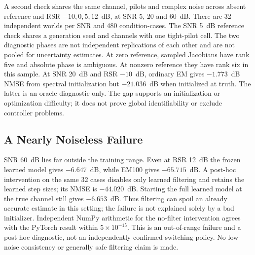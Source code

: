 A second check shares the same channel, pilots and complex noise across
absent reference and RSR $-10,0,5,12$~dB, at SNR 5, 20 and 60~dB.
There are 32 independent worlds per SNR and 480 condition-cases.
The SNR 5~dB reference check shares a generation seed and channels with
one tight-pilot cell. The two diagnostic phases are not independent
replications of each other and are not pooled for uncertainty estimates.
At zero reference, sampled Jacobians have rank five and absolute phase
is ambiguous. At nonzero reference they have rank six in this sample.
At SNR 20~dB and RSR $-10$~dB, ordinary EM gives $-1.773$~dB NMSE
from spectral initialization but $-21.036$~dB when initialized at truth.
The latter is an oracle diagnostic only. The gap supports an initialization
or optimization difficulty; it does not prove global identifiability or
exclude controller problems.

\subsection{A Nearly Noiseless Failure}
SNR 60~dB lies far outside the training range. Even at RSR 12~dB the
frozen learned model gives $-6.647$~dB, while EM100 gives $-65.715$~dB.
A post-hoc intervention on the same 32 cases disables only learned
filtering and retains the learned step sizes; its NMSE is $-44.020$~dB.
Starting the full learned model at the true channel still gives
$-6.653$~dB. Thus filtering can spoil an already accurate estimate in
this setting; the failure is not explained solely by a bad initializer.
Independent NumPy arithmetic for the no-filter intervention agrees with
the PyTorch result within $5\times10^{-15}$. This is an out-of-range
failure and a post-hoc diagnostic, not an independently confirmed switching
policy. No low-noise consistency or generally safe filtering claim is made.
